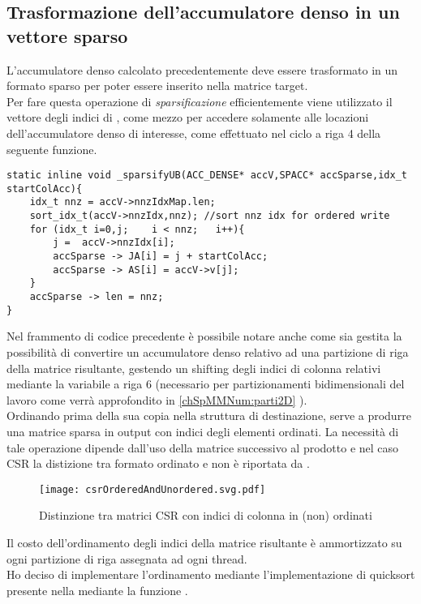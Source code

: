 \subsection{Trasformazione dell'accumulatore denso in un vettore sparso}	\label{chSpMMNum:sparsify}
L'accumulatore denso calcolato precedentemente deve essere trasformato in un formato sparso per poter essere 
inserito nella matrice target.\\
Per fare questa operazione di \emph{sparsificazione} efficientemente viene utilizzato il vettore degli indici di ,
come mezzo per accedere solamente alle locazioni dell'accumulatore denso  di interesse,
come effettuato nel ciclo a riga 4 della seguente funzione.\\
\begin{lstlisting}
static inline void _sparsifyUB(ACC_DENSE* accV,SPACC* accSparse,idx_t startColAcc){
    idx_t nnz = accV->nnzIdxMap.len;
    sort_idx_t(accV->nnzIdx,nnz); //sort nnz idx for ordered write
    for (idx_t i=0,j;    i < nnz;   i++){
        j =  accV->nnzIdx[i];
        accSparse -> JA[i] = j + startColAcc;
        accSparse -> AS[i] = accV->v[j];
    }
    accSparse -> len = nnz;
}
\end{lstlisting}
Nel frammento di codice precedente è possibile notare anche come sia gestita 
la possibilità di convertire un accumulatore denso relativo ad una partizione di riga della matrice risultante, 
gestendo un shifting degli indici di colonna \nnz relativi mediante la variabile  a riga 6
(necessario per partizionamenti bidimensionali del lavoro come verrà approfondito in \ref{chSpMMNum:parti2D} ).\\
Ordinando  prima della sua copia nella struttura di destinazione, 
serve a produrre una matrice sparsa in output con indici degli elementi \nnz ordinati.
La necessità di tale operazione dipende dall'uso della matrice successivo al prodotto 
e nel caso CSR la distizione tra formato ordinato e non è riportata da \cite{adaptiveTilingSpMM}.\\
\begin{figure}[H]
  \centering \texttt{[image: csrOrderedAndUnordered.svg.pdf]}
  \caption[rappresentazione CSR (non) ordinata]
  {Distinzione tra matrici CSR con indici di colonna in  (non) ordinati}
  \decoRule \label{fig:layeredGraphInnerProduct}
\end{figure}
Il costo dell'ordinamento degli indici della matrice risultante è ammortizzato su ogni partizione di riga assegnata ad ogni thread.\\
Ho deciso di implementare l'ordinamento mediante l'implementazione di quicksort
presente nella  mediante la funzione .\\


